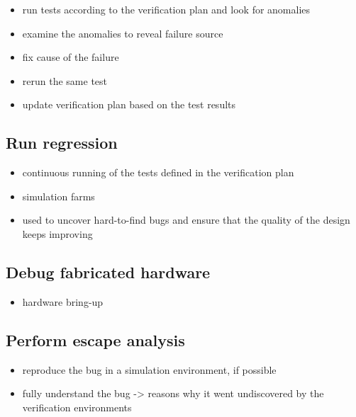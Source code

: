\documentclass[]{article}
\providecommand{\tightlist}{%
  \setlength{\itemsep}{0pt}\setlength{\parskip}{0pt}}
\begin{document}
\begin{itemize}
\tightlist
\item
  run tests according to the verification plan and look for anomalies
\item
  examine the anomalies to reveal failure source
\item
  fix cause of the failure
\item
  rerun the same test
\item
  update verification plan based on the test results
\end{itemize}

\hypertarget{run-regression}{%
\subsection{Run regression}\label{run-regression}}

\begin{itemize}
\tightlist
\item
  continuous running of the tests defined in the verification plan
\item
  simulation farms
\item
  used to uncover hard-to-find bugs and ensure that the quality of the
  design keeps improving
\end{itemize}

\hypertarget{debug-fabricated-hardware}{%
\subsection{Debug fabricated hardware}\label{debug-fabricated-hardware}}

\begin{itemize}
\tightlist
\item
  hardware bring-up
\end{itemize}

\hypertarget{perform-escape-analysis}{%
\subsection{Perform escape analysis}\label{perform-escape-analysis}}

\begin{itemize}
\tightlist
\item
  reproduce the bug in a simulation environment, if possible
\item
  fully understand the bug -\textgreater{} reasons why it went
  undiscovered by the verification environments
\end{itemize}
\end{document}
